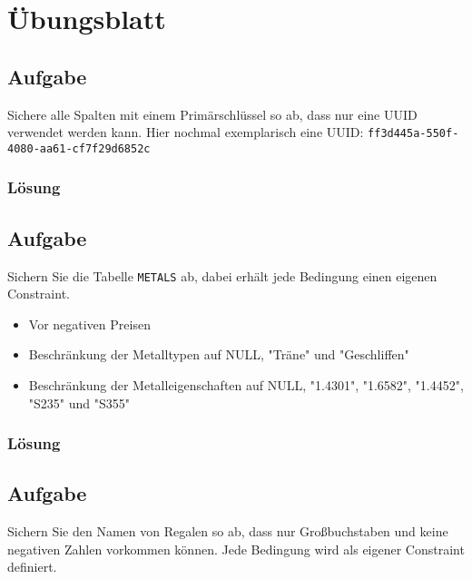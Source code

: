 \section{Übungsblatt}
\label{sec:uebung_05}

\subsection{Aufgabe}
\label{sec:uebung_05.aufgabe_01}
Sichere alle Spalten mit einem Primärschlüssel so ab, dass nur eine UUID verwendet werden kann.
Hier nochmal exemplarisch eine UUID: \texttt{ff3d445a-550f-4080-aa61-cf7f29d6852c}

\subsubsection*{Lösung}
\label{sec:uebung_05.aufgabe_01.loesung}

\subsection{Aufgabe}
\label{sec:uebung_05.aufgabe_02}
Sichern Sie die Tabelle \texttt{METALS} ab, dabei erhält jede Bedingung einen eigenen Constraint.
\begin{itemize}
  \item Vor negativen Preisen
  \item Beschränkung der Metalltypen auf NULL, "Träne" und "Geschliffen"
  \item Beschränkung der Metalleigenschaften auf NULL, "1.4301", "1.6582", "1.4452", "S235" und "S355"
\end{itemize}

\subsubsection*{Lösung}
\label{sec:uebung_05.aufgabe_02.loesung}

\subsection{Aufgabe}
\label{sec:uebung_05.aufgabe_03}
Sichern Sie den Namen von Regalen so ab, dass nur Großbuchstaben und keine negativen Zahlen vorkommen können. Jede Bedingung wird als eigener Constraint definiert.

